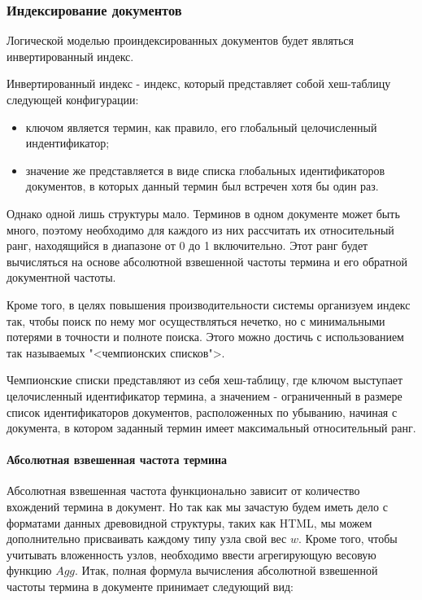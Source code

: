 \subsubsection{Индексирование документов}

Логической моделью проиндексированных документов будет являться инвертированный индекс. 

Инвертированный индекс - индекс, который представляет собой хеш-таблицу следующей конфигурации: 
\begin{itemize}
\item ключом является термин, как правило, его глобальный целочисленный индентификатор;
\item значение же представляется в виде списка глобальных идентификаторов документов, в которых данный термин был встречен хотя бы один раз.
\end{itemize}

Однако одной лишь структуры мало. Терминов в одном документе может быть много, поэтому необходимо для каждого из них рассчитать их относительный ранг, находящийся в диапазоне от 0 до 1 включительно. Этот ранг будет вычисляться на основе абсолютной взвешенной частоты термина и его обратной документной частоты.

Кроме того, в целях повышения производительности системы организуем индекс так, чтобы поиск по нему мог осуществляться нечетко, но с минимальными потерями в точности и полноте поиска. Этого можно достичь с использованием так называемых "<чемпионских списков">.

Чемпионские списки представляют из себя хеш-таблицу, где ключом выступает целочисленный идентификатор термина, а значением - ограниченный в размере список идентификаторов документов, расположенных по убыванию, начиная с документа, в котором заданный термин имеет максимальный относительный ранг. 

\paragraph{Абсолютная взвешенная частота термина}

Абсолютная взвешенная частота функционально зависит от количество вхождений термина в документ. Но так как мы зачастую будем иметь дело с форматами данных древовидной структуры, таких как HTML, мы можем дополнительно присваивать каждому типу узла свой вес $w$. Кроме того, чтобы учитывать вложенность узлов, необходимо ввести агрегирующую весовую функцию $Agg$. Итак, полная формула вычисления абсолютной взвешенной частоты термина в документе принимает следующий вид:

